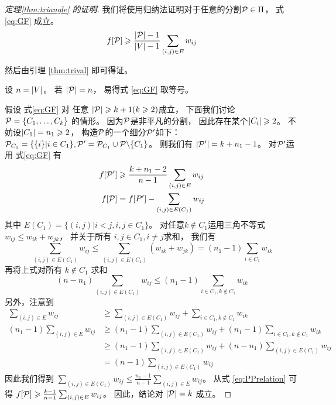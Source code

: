   \begin{proof}[定理\ref{thm:triangle} 的证明]
    我们将使用归纳法证明对于任意的分割$\P \in \Pi$，
    式\eqref{eq:GF} 成立。
    \begin{equation}\label{eq:GF}
    f[\P] \geq \frac{\abs{\P}-1}{\abs{V}-1} \sum_{(i,j) \in E} w_{ij}
    \end{equation}
    
    然后由引理 \ref{thm:trival}
    即可得证。
    
    设 $n=\abs{V}$。
    若 $\abs{\P}=n$，
    易得式 \eqref{eq:GF} 取等号。
    
    假设 式\eqref{eq:GF} 对 任意
    $\abs{\P} \geq k+1(k\geq 2)$成立，
    下面我们讨论 $\P=\{C_1, \dots, C_k\}$
    的情形。
    因为$\P$是非平凡的分割，
    因此存在某个$\abs{C_i}\geq 2$。
    不妨设$\abs{C_1}=n_1\geq 2$，
    构造$\P$的一个细分$\P'$如下：
    $\P_{C_1} = \{\{i\}| i \in C_1\}, \P'=\P_{C_1} \cup \P \backslash \{C_1\}$。
    则我们有 $\abs{\P'} = k+n_1-1$。
    对$\P'$运用 式\eqref{eq:GF} 有
    \begin{align}\label{eq:PPrelation}
    f[\P'] &
    \geq \frac{k+n_1 -2}{n-1}\sum_{(i,j) \in E} w_{ij} \\
    f[\P] & =f[P'] - \sum_{(i,j) \in E(C_1)} w_{ij}
    \end{align}
    其中
    $E(C_1) =\{ (i,j) |i<j, i, j\in C_1 \}$。
    对任意$k \not\in C_1$运用三角不等式
    $w_{ij} \leq w_{ik} + w_{jk}$，
    并关于所有 $i, j \in C_1, i\neq j$求和，
    我们有
    $$
    \sum_{(i,j) \in E(C_1)} w_{ij} \leq \sum_{(i,j) \in E(C_1)} (w_{ik} + w_{jk}) = (n_1-1)\sum_{i\in C_1} w_{ik}
    $$
    再将上式对所有 $k \not\in C_1$ 求和
    $$
    (n - n_1) \sum_{(i,j) \in E(C_1)} w_{ij} \leq (n_1 - 1) \sum_{i \in C_1, k \not\in C_1} w_{ik}
    $$
    另外，注意到
    \begin{align*}
    \sum_{(i,j) \in E} w_{ij}  & \geq \sum_{(i,j) \in E(C_1)} w_{ij} + \sum_{i\in C_1, k\not\in C_1} w_{ik} \\
    (n_1 - 1)\sum_{(i,j) \in E} w_{ij}  & \geq (n_1 -1 )\sum_{(i,j) \in E(C_1)} w_{ij} + (n_1-1)\sum_{i\in C_1, k\not\in C_1} w_{ik} \\
    & \geq (n_1 -1 )\sum_{(i,j) \in E(C_1)} w_{ij} + (n - n_1) \sum_{(i,j) \in E(C_1)} w_{ij}\\
    & = (n-1) \sum_{(i,j) \in E(C_1)} w_{ij}
    \end{align*}
   因此我们得到 $\sum_{(i,j) \in E(C_1)} w_{ij} \leq \frac{n_1-1}{n-1}\sum_{(i,j) \in E} w_{ij}$。
   从式 \eqref{eq:PPrelation} 可得
    $f[\P] \geq \frac{k-1}{n-1}\sum_{(i,j) \in E} w_{ij}$。
    因此，结论对 $\abs{\P}=k$ 成立。
    \end{proof}
